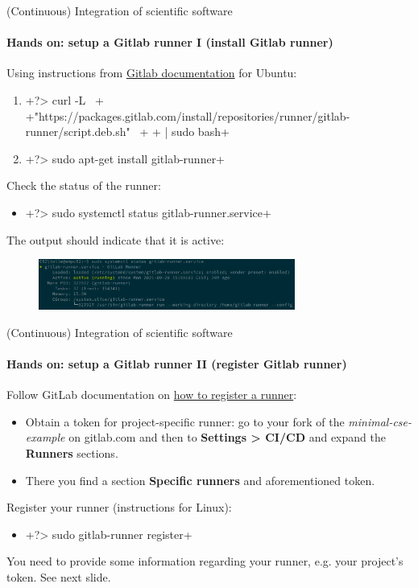 \begin{frame}{(Continuous) Integration of scientific software}
    \framesubtitle{Hands on: setup a Gitlab runner I (install Gitlab runner)}
    Using instructions from \href{https://docs.gitlab.com/runner/install/linux-repository.html}{Gitlab documentation} for Ubuntu:
    \begin{enumerate}
        \item {}+?> curl -L \ +
              +"https://packages.gitlab.com/install/repositories/runner/gitlab-runner/script.deb.sh" \ +
              +  | sudo bash+
        \item {}+?> sudo apt-get install gitlab-runner+
    \end{enumerate}
    Check the status of the runner:
    \begin{itemize}
        \item {}+?> sudo systemctl status gitlab-runner.service+
    \end{itemize}
    The output should indicate that it is active:
    \begin{figure}
        \includegraphics[width=0.75\textwidth]{figures/gitlab-runner-active.png}
    \end{figure}
\end{frame}


\begin{frame}{(Continuous) Integration of scientific software}
    \framesubtitle{Hands on: setup a Gitlab runner II (register Gitlab runner)}
    Follow GitLab documentation on \href{https://docs.gitlab.com/runner/register/index.html}{how to register a runner}:
    \begin{itemize}
        \item Obtain a token for project-specific runner: go to your fork of the \emph{minimal-cse-example} on gitlab.com and then to \textbf{Settings > CI/CD} and expand the \textbf{Runners} sections.
        \item There you find a section \textbf{Specific runners} and aforementioned token.
    \end{itemize}
    Register your runner (instructions for Linux):
    \begin{itemize}
        \item {}+?> sudo gitlab-runner register+
    \end{itemize}
    You need to provide some information regarding your runner, e.g. your project's token. See next slide.
\end{frame}


